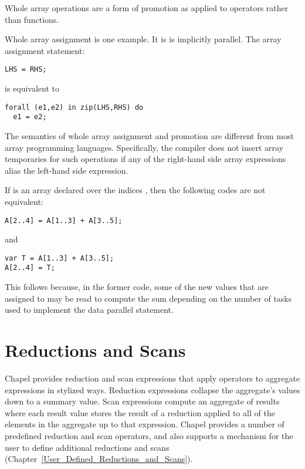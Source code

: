 Whole array operations are a form of promotion as applied to operators
rather than functions.

Whole array assignment is one example. It is is implicitly parallel.
The array assignment statement:
\begin{chapel}
\begin{verbatim}
LHS = RHS;
\end{verbatim}
\end{chapel}
is equivalent to
\begin{chapel}
\begin{verbatim}
forall (e1,e2) in zip(LHS,RHS) do
  e1 = e2;
\end{verbatim}
\end{chapel}

The semantics of whole array assignment and promotion are different
from most array programming languages.  Specifically, the compiler
does not insert array temporaries for such operations if any of the
right-hand side array expressions alias the left-hand side expression.

%
%
\begin{example}
If  is an array declared over the indices , then
the following codes are not equivalent:
\begin{chapel}
\begin{verbatim}
A[2..4] = A[1..3] + A[3..5];
\end{verbatim}
\end{chapel}
and
\begin{chapel}
\begin{verbatim}
var T = A[1..3] + A[3..5];
A[2..4] = T;
\end{verbatim}
\end{chapel}
This follows because, in the former code, some of the new values that
are assigned to  may be read to compute the sum depending on
the number of tasks used to implement the data parallel statement.
\end{example}



\section{Reductions and Scans}
\label{Reductions_and_Scans}

Chapel provides reduction and scan expressions that apply operators to
aggregate expressions in stylized ways.  Reduction expressions
collapse the aggregate's values down to a summary value.  Scan
expressions compute an aggregate of results where each result value
stores the result of a reduction applied to all of the elements in the
aggregate up to that expression.  Chapel provides a number of predefined
reduction and scan operators, and also supports a mechanism for the
user to define additional reductions and
scans (Chapter~\ref{User_Defined_Reductions_and_Scans}).

